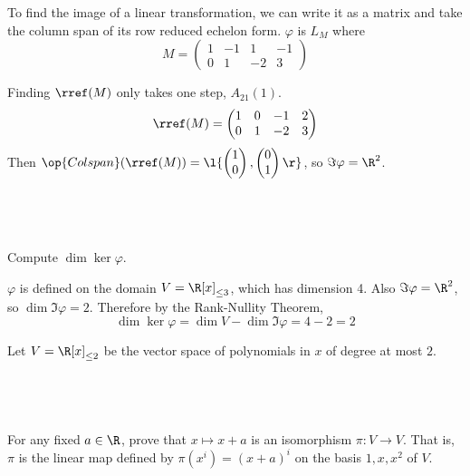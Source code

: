 \documentclass[a4paper]{article}
\begin{document}
To find the image of a linear transformation, we can write it as a matrix and take the column span of its row reduced echelon form. $\varphi$ is $L_M$ where $$M = \begin{pmatrix} 1 & -1 & 1 & -1\\ 0 & 1 & -2 & 3 \end{pmatrix}$$

Finding $\rref(M)$ only takes one step, $A_{21}(1)$. $$\rref(M) = \begin{pmatrix} 1 & 0 & -1 & 2\\ 0 & 1 & -2 & 3 \end{pmatrix}$$
Then $\op{Colspan}(\rref(M)) = \l\{ \begin{pmatrix}1\\ 0\end{pmatrix}, \begin{pmatrix}0\\ 1\end{pmatrix} \r\}$, so $\Im \varphi = \R^2$.

\subsection{~} %

\begin{questionbody}
Compute $\dim \ker \varphi$.
\end{questionbody}

$\varphi$ is defined on the domain $V = \R[x]_{\le 3}$, which has dimension 4. Also $\Im \varphi = \R^2$, so $\dim \Im \varphi = 2$. Therefore by the Rank-Nullity Theorem, $$\dim \ker \varphi = \dim V - \dim \Im \varphi = 4 - 2 = 2$$



\begin{questionbody}
Let $V = \R[x]_{\le 2}$ be the vector space of polynomials in $x$ of degree at most $2$.
\end{questionbody}

\subsection{~} %

\begin{questionbody}
For any fixed $a \in \R$, prove that $x \mapsto x+a$ is an isomorphism $\pi : V \to V$. That is, $\pi$ is the linear map defined by $\pi(x^i) = (x+a)^i$ on the basis $1, x, x^2$ of $V$.
\end{questionbody}
\end{document}
